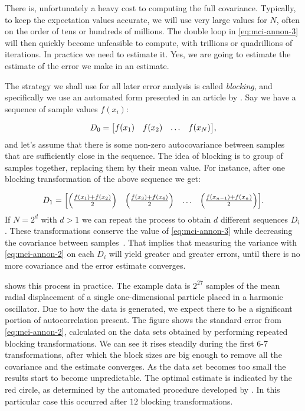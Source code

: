 \documentclass[Thesis.tex]{subfiles}
\begin{document}
There is, unfortunately a heavy cost to computing the full covariance.
Typically, to keep the expectation values accurate, we will use very large
values for $N$, often on the order of tens or hundreds of millions. The double loop in
\cref{eq:mci-annon-3} will then quickly become unfeasible to compute, with
trillions or quadrillions of iterations. In practice we need to estimate it.
Yes, we are going to estimate the estimate of the error we make in an estimate.

The strategy we shall use for all later error analysis is called \emph{blocking},
and specifically we use an automated form presented in an article by
\textcite{Jonsson-2018}. Say we have a sequence of sample values $f(x_i)$:

\begin{align}
  D_0 = \mqty[f(x_1) & f(x_2) & \dots & f(x_N)],
\end{align}
and let's assume that there is some non-zero autocovariance between samples that are
sufficiently close in the sequence. The idea of blocking is to group
 of samples together, replacing them by their mean value. For
instance, after one blocking transformation of the above sequence we get:

\begin{align}
  D_1 = \mqty[\qty(\frac{f(x_1) + f(x_2)}{2}) & \qty(\frac{f(x_3) + f(x_4)}{2}) & \dots & \qty(\frac{f(x_{n-1}) + f(x_n)}{2})].
\end{align}
If $N = 2^d$ with $d > 1$ we can repeat the process to obtain $d$ different
sequences $D_i$. These transformations conserve the value of \cref{eq:mci-annon-3}
while decreasing the covariance between samples~\cite{Jonsson-2018}. That implies that measuring
the variance with \cref{eq:mci-annon-2} on each $D_i$ will yield greater and
greater errors, until there is no more covariance and the error estimate
converges.

 shows this process in practice. The example
data is $2^{27}$ samples of the mean radial displacement of a single
one-dimensional particle placed in a harmonic oscillator. Due to how the data is
generated, we expect there to be a significant portion of autocorrelation
present. The figure shows the standard error from \cref{eq:mci-annon-2},
calculated on the data sets obtained by performing repeated blocking
transformations. We can see it rises steadily during the first $6$-$7$
transformations, after which the block sizes are big
enough to remove all the covariance and the estimate converges. As
the data set becomes too small the results start to become unpredictable. The
optimal estimate is indicated by the red circle, as determined by the automated
procedure developed by \textcite{Jonsson-2018}. In this particular case this occurred after
$\num{12}$ blocking transformations.
\end{document}

